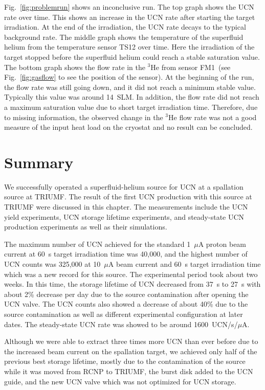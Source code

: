 Fig.~\ref{fig:problemrun} shows an inconclusive run. The top graph
shows the UCN rate over time. This shows an increase in the UCN rate
after starting the target irradiation. At the end of the irradiation,
the UCN rate decays to the typical background rate. The middle graph
shows the temperature of the superfluid helium from the temperature
sensor TS12 over time. Here the irradiation of the target stopped
before the superfluid helium could reach a stable saturation
value. The bottom graph shows the flow rate in the $^3$He from sensor
FM1~(see Fig.~\ref{fig:gasflow} to see the position of the sensor). At
the beginning of the run, the flow rate was still going down, and it
did not reach a minimum stable value. Typically this value was around
14~SLM. In addition, the flow rate did not reach a maximum saturation
value due to short target irradiation time. Therefore, due to missing
information, the observed change in the $^3$He flow rate was not a
good measure of the input heat load on the cryostat and no result can
be concluded.


\section{Summary}
We successfully operated a superfluid-helium source for UCN at a
spallation source at TRIUMF. The result of the first UCN production
with this source at TRIUMF were discussed in this
chapter. The measurements include the UCN yield experiments, UCN
storage lifetime experiments, and steady-state UCN production
experiments as well as their simulations.

The maximum number of UCN achieved for the standard 1~$\mu$A proton
beam current at 60~s target irradiation time was 40,000, and the
highest number of UCN counts was 325,000 at 10~$\mu$A beam current and
60~s target irradiation time which was a new record for this
source. The experimental period took about two weeks. In this time,
the storage lifetime of UCN decreased from 37~s to 27~s with about 2\%
decrease per day due to the source contamination after opening the UCN
valve. The UCN counts also showed a decrease of about 40\% due to the
source contamination as well as different experimental configuration
at later dates. The steady-state UCN rate was showed to be around
1600~UCN/s/$\mu$A.

Although we were able to extract three times more UCN than ever before
due to the increased beam current on the spallation target, we
achieved only half of the previous best storage lifetime, mostly due
to the contamination of the source while it was moved from RCNP to
TRIUMF, the burst disk added to the UCN guide, and the new UCN valve
which was not optimized for UCN storage.

